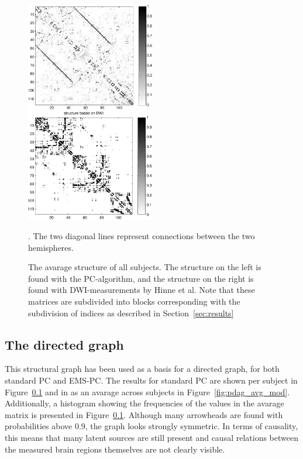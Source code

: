 \documentclass[a4paper, 10pt, english, onecolumn]{article}
\begin{document}
\begin{figure}[h!]
  \centering
  \includegraphics[width=0.5\textwidth]{images/struct_full}
  \includegraphics[width=0.5\textwidth]{images/structure_max}
  \caption{The avarage structure of all subjects. The structure on the left is found with the PC-algorithm, and the structure on the right is found with DWI-measurements by Hinne et al. Note that these matrices are subdivided into blocks corresponding with the subdivision of indices as described in Section~\ref{sec:results}}. The two diagonal lines represent connections between the two hemispheres.
\label{fig:struct_avg}
\end{figure}

\subsection{The directed graph}
This structural graph has been used as a basis for a directed graph, for both standard PC and EMS-PC.
The results for standard PC are shown per subject in Figure~\ref{} and in as an avarage across subjects in Figure~\ref{fig:pdag_avg_mod}.
Additionally, a histogram showing the frequencies of the values in the avarage matrix is presented in Figure~\ref{}.
Although many arrowheads are found with probabilities above 0.9, the graph looks strongly symmetric.
In terms of causality, this means that many latent sources are still present and causal relations between the measured brain regions themselves are not clearly visible.
\end{document}
